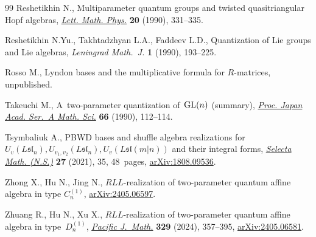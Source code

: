 \begin{thebibliography}{99}
Reshetikhin N., Multiparameter quantum groups and twisted quasitriangular
 {H}opf algebras, \href{https://doi.org/10.1007/BF00626530}{\textit{Lett.
 Math. Phys.}} \textbf{20} (1990), 331--335.

Reshetikhin N.Yu., Takhtadzhyan L.A., Faddeev L.D., Quantization of {L}ie groups
 and {L}ie algebras, \textit{Leningrad Math.~J.} \textbf{1} (1990), 193--225.

Rosso M., Lyndon bases and the multiplicative formula for $R$-matrices,
 {u}npublished.

Takeuchi M., A~two-parameter quantization of~{${\rm GL}(n)$} (summary),
 \href{https://doi.org/10.3792/pjaa.66.112}{\textit{Proc. Japan Acad. Ser.~A
 Math. Sci.}} \textbf{66} (1990), 112--114.

Tsymbaliuk A., P{BWD} bases and shuffle algebra realizations for
 {$U_v(L\mathfrak{sl}_n), U_{v_1, v_2}(L\mathfrak{sl}_n),
 U_v(L\mathfrak{sl}(m|n))$} and their integral forms,
 \href{https://doi.org/10.1007/s00029-021-00634-5}{\textit{Selecta Math.
 (N.S.)}} \textbf{27} (2021), 35, 48~pages,
 \href{http://arxiv.org/abs/1808.09536}{arXiv:1808.09536}.

Zhong X., Hu N., Jing N., $RLL$-realization of two-parameter quantum affine
 algebra in type $C^{(1)}_n$,
 \href{http://arxiv.org/abs/2405.06597}{arXiv:2405.06597}.

Zhuang R., Hu N., Xu X., {$RLL$}-realization of two-parameter quantum affine
 algebra in type~{$D_n^{(1)}$},
 \href{https://doi.org/10.2140/pjm.2024.329.357}{\textit{Pacific J.~Math.}}
 \textbf{329} (2024), 357--395,
 \href{http://arxiv.org/abs/2405.06581}{arXiv:2405.06581}.

\end{thebibliography}
